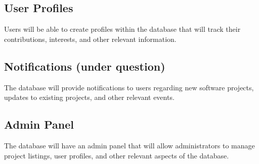\subsection{User Profiles}
Users will be able to create profiles within the database that will track their
contributions, interests, and other relevant information.

\subsection{Notifications (under question)} 
The database will provide notifications to users regarding new software projects,
updates to existing projects, and other relevant events.

\subsection{Admin Panel}
The database will have an admin panel that will allow administrators to manage
project listings, user profiles, and other relevant aspects of the database.



